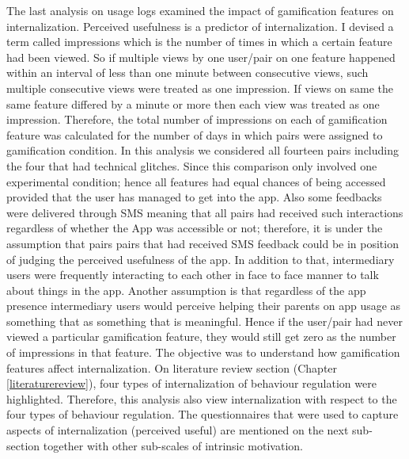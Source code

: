 The last analysis on usage logs examined the impact of gamification features on internalization. Perceived usefulness is a predictor of internalization. I devised a term called impressions which is the number of times in which a certain feature had been viewed. So if multiple views by one user/pair on one feature happened within an interval of less than one minute between consecutive views, such multiple consecutive views were treated as one impression. If views on same the same feature differed by a minute or more then each view was treated as one impression. Therefore, the total number of impressions on each of gamification feature was calculated for the number of days in which pairs were assigned to gamification condition. In this analysis we considered all fourteen pairs  including the four that had technical glitches. Since this comparison only involved one experimental condition; hence all features had equal chances of being accessed provided that the user has managed to get into the app. Also some feedbacks were delivered through SMS meaning that all pairs had received such interactions regardless of whether the App was accessible or not; therefore, it is under the assumption that pairs pairs that had received SMS feedback could be in position of judging the perceived usefulness of the app. In addition to that, intermediary users were frequently interacting to each other in face to face manner to talk about things in the app. Another assumption is that regardless of the app presence intermediary users would perceive helping their parents on app usage as something that as something that is meaningful. Hence if the user/pair had never viewed a particular gamification feature, they would still get zero as the number of impressions in that feature. The objective was to understand how gamification features affect internalization. On literature review section (Chapter \ref{literaturereview}), four types of internalization of behaviour regulation were highlighted. Therefore, this analysis also view internalization with respect to the four types of behaviour regulation. The questionnaires that were used to capture aspects of internalization (perceived useful) are mentioned on the next sub-section together with other sub-scales of intrinsic motivation.

